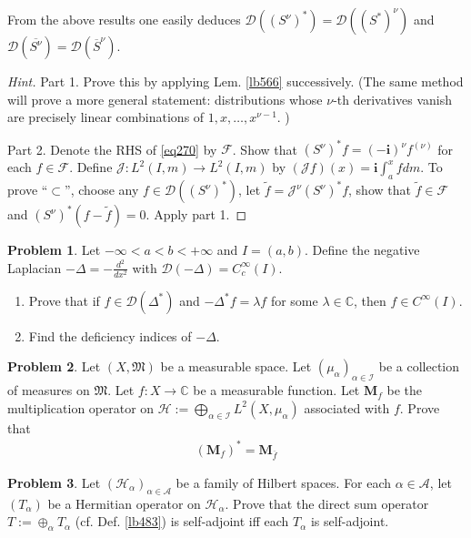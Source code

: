 \documentclass[12pt,b5paper,notitlepage]{article}
\theoremstyle{definition}
\newtheorem{prob}{\color{red}Problem}[section]
\theoremstyle{plain}
\newcommand{\fk}{\mathfrak}
\newcommand{\wtd}{\widetilde}
\newcommand{\ovl}{\overline}
\newcommand{\Dom}{\mathscr{D}}
\newcommand{\scr}{\mathscr}
\newcommand{\im}{\mathbf{i}}
\newcommand{\Cbb}{\mathbb C}
\newcommand{\MF}{\mathcal F}
\newcommand{\MH}{\mathcal H}
\newcommand{\MJ}{\mathcal J}
\newcommand{\SI}{\mathscr I}
\newcommand{\SA}{\mathscr A}
\newcommand{\Mbf}{\mathbf M}
\numberwithin{equation}{section}
\begin{document}
From the above results one easily deduces $\Dom((S^\nu)^*)=\Dom((S^*)^\nu)$ and $\Dom(\ovl{S^\nu})=\Dom(\ovl S^\nu)$.
 
\begin{proof}[Hint]
Part 1. Prove this by applying Lem. \ref{lb566} successively. (The same method will prove a more general statement: distributions whose $\nu$-th derivatives vanish are precisely linear combinations of $1,x,\dots,x^{\nu-1}$. )

Part 2. Denote the RHS of \eqref{eq270} by $\MF$. Show that $(S^\nu)^*f=(-\im)^\nu f^{(\nu)}$ for each $f\in\MF$. Define $\MJ:L^2(I,m)\rightarrow L^2(I,m)$ by $(\MJ f)(x)=\im\int_a^x fdm$. To prove ``$\subset$'', choose any $f\in\Dom((S^\nu)^*)$, let $\wtd f=\MJ^\nu(S^\nu)^*f$, show that $\wtd f\in\MF$ and $(S^\nu)^*(f-\wtd f)=0$. Apply part 1. 
\end{proof}


\begin{prob}
Let $-\infty<a<b<+\infty$ and $I=(a,b)$. Define the negative Laplacian $-\Delta=-\frac {d^2}{dx^2}$ with $\Dom(-\Delta)=C_c^\infty(I)$.
\begin{enumerate}
\item Prove that if $f\in\Dom(\Delta^*)$ and $-\Delta^* f=\lambda f$ for some $\lambda\in\Cbb$, then $f\in C^\infty(I)$.
\item Find the deficiency indices of $-\Delta$. 
\end{enumerate}
\end{prob}



\begin{prob}
Let $(X,\fk M)$ be a measurable space. Let $(\mu_\alpha)_{\alpha\in\SI}$ be a collection of measures on $\fk M$. Let $f:X\rightarrow\Cbb$ be a measurable function. Let $\Mbf_f$ be the multiplication operator on $\MH:=\bigoplus_{\alpha\in\SI}L^2(X,\mu_\alpha)$ associated with $f$. Prove that
\begin{align*}
(\Mbf_f)^*=\Mbf_{\ovl f}
\end{align*} 
\end{prob}


\begin{prob}\label{lb484}
Let $(\MH_\alpha)_{\alpha\in\SA}$ be a family of Hilbert spaces. For each $\alpha\in\scr A$, let $(T_\alpha)$ be a Hermitian operator on $\MH_\alpha$. Prove that the direct sum operator $T:=\oplus_\alpha T_\alpha$ (cf. Def. \ref{lb483}) is self-adjoint iff each $T_\alpha$ is self-adjoint.
\end{prob}
\end{document}
